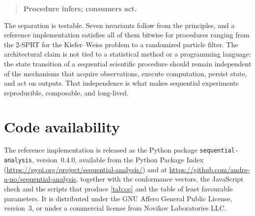\documentclass[11pt,a4paper]{article}
\theoremstyle{definition}
\theoremstyle{remark}
\begin{document}
\begin{quote}
\textbf{Procedure infers; consumers act.}
\end{quote}

The separation is testable. Seven invariants follow from the principles,
and a reference implementation satisfies all of them bitwise for
procedures ranging from the 2-SPRT for the Kiefer--Weiss problem to a
randomized particle filter. The architectural claim is not tied to a
statistical method or a programming language: the state transition of a
sequential scientific procedure should remain independent of the
mechanisms that acquire observations, execute computation, persist
state, and act on outputs. That independence is what makes sequential
experiments reproducible, composable, and long-lived.

\section*{Code availability}

The reference implementation is released as the Python package
\texttt{sequential-analysis}, version~0.4.0, available from the Python
Package Index (\url{https://pypi.org/project/sequential-analysis/}) and
at \url{https://github.com/andre-a-no/sequential-analysis}, together with
the conformance vectors, the JavaScript check and the scripts that
produce \cref{tab:oc} and the table of least favourable parameters. It
is distributed under the GNU Affero General Public License, version~3,
or under a commercial license from Novikov Laboratories LLC.

\printbibliography
\end{document}

